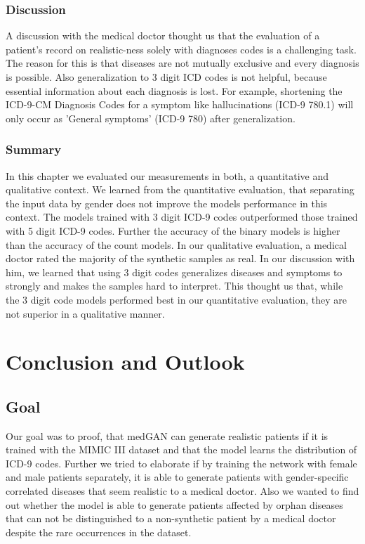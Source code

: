\documentclass[11pt, a4paper]{book}
\begin{document}
\subsection{Discussion}
A discussion with the medical doctor thought us that the evaluation of a patient's record on realistic-ness solely with diagnoses codes is a challenging task. The reason for this is that diseases are not mutually exclusive and every diagnosis is possible. Also generalization to 3 digit ICD codes is not helpful, because essential information about each diagnosis is lost. For example, shortening the ICD-9-CM Diagnosis Codes for a symptom like hallucinations (ICD-9 780.1) will only occur as 'General symptoms' (ICD-9 780) after generalization. 

\subsection{Summary}
In this chapter we evaluated our measurements in both, a quantitative and qualitative context. We learned from the quantitative evaluation, that separating the input data by gender does not improve the models performance in this context. The models trained with 3 digit ICD-9 codes outperformed those trained with 5 digit ICD-9 codes. Further the accuracy of the binary models is higher than the accuracy of the count models.
In our qualitative evaluation, a medical doctor rated the majority of the synthetic samples as real. In our discussion with him, we learned that using 3 digit codes generalizes diseases and symptoms to strongly and makes the samples hard to interpret.
This thought us that, while the 3 digit code models performed best in our quantitative evaluation, they are not superior in a qualitative manner.
\chapter{Conclusion and Outlook}
\section{Goal}
Our goal was to proof, that medGAN can generate realistic patients if it is trained with the MIMIC III dataset and that the model learns the distribution of ICD-9 codes. Further we tried to elaborate if by training the network with female and male patients separately, it is able to generate patients with gender-specific correlated diseases that seem realistic to a medical doctor. Also we wanted to find out whether the model is able to generate patients affected by orphan diseases that can not be distinguished to a non-synthetic patient by a medical doctor despite the rare occurrences in the dataset.
\end{document}
